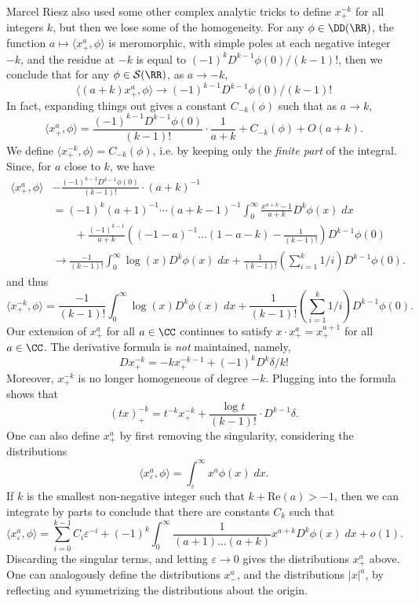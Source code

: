 \begin{example}
  Marcel Riesz also used some other complex analytic tricks to define $x^{-k}_+$ for all integers $k$, but then we lose some of the homogeneity. For any $\phi \in \DD(\RR)$, the function $a \mapsto \langle x^a_+, \phi \rangle$ is meromorphic, with simple poles at each negative integer $-k$, and the residue at $-k$ is equal to $(-1)^k D^{k-1} \phi(0) / (k-1)!$, then we conclude that for any $\phi \in \mathcal{S}(\RR)$, as $a \to -k$,
  \[ \langle (a + k) x^a_+, \phi \rangle \to (-1)^{k-1} D^{k-1} \phi(0) / (k-1)! \]
  In fact, expanding things out gives a constant $C_{-k}(\phi)$ such that as $a \to k$,
  \[ \langle x^a_+, \phi \rangle = \frac{(-1)^{k-1} D^{k-1} \phi(0)}{(k-1)!} \cdot \frac{1}{a + k} + C_{-k}(\phi) + O(a+k). \]
  We define $\langle x^{-k}_+, \phi \rangle = C_{-k}(\phi)$, i.e. by keeping only the \emph{finite part} of the integral. Since, for $a$ close to $k$, we have
  \begin{align*} \langle x^a_+, \phi \rangle &- \frac{(-1)^{k-1} D^{k-1} \phi(0)}{(k-1)!} \cdot (a+k)^{-1}\\
  &= (-1)^k (a+1)^{-1} \cdots (a+k-1)^{-1} \int_0^\infty \frac{x^{a + k} - 1}{a+k} D^k \phi(x)\; dx\\
  &\quad\quad + \frac{(-1)^{k-1}}{a+k} \left( (-1-a)^{-1} \dots (1-a-k) - \frac{1}{(k-1)!} \right) D^{k-1} \phi(0)\\
  &\to \frac{-1}{(k-1)!} \int_0^\infty \log(x) D^k \phi(x)\; dx + \frac{1}{(k-1)!} \left(\sum_{i = 1}^k 1/i \right) D^{k-1} \phi(0).
  \end{align*}
  and thus
  \[ \langle x^{-k}_+, \phi \rangle = \frac{-1}{(k-1)!} \int_0^\infty \log(x) D^k \phi(x)\; dx + \frac{1}{(k-1)!} \left(\sum_{i = 1}^k 1/i \right) D^{k-1} \phi(0). \]
  Our extension of $x^a_+$ for all $a \in \CC$ continues to satisfy $x \cdot x^a_+ = x^{a+1}_+$ for all $a \in \CC$. The derivative formula is \emph{not} maintained, namely,
  \[ D x^{-k}_+ = -k x^{-k-1}_+ + (-1)^k D^k \delta / k! \]
  Moreover, $x^{-k}_+$ is no longer homogeneous of degree $-k$. Plugging into the formula shows that
  \[ (tx)^{-k}_+ = t^{-k} x^{-k}_+ + \frac{\log t}{(k-1)!} \cdot D^{k-1} \delta. \]
  One can also define $x^a_+$ by first removing the singularity, considering the distributions
  \[ \langle x^a_\varepsilon, \phi \rangle = \int_\varepsilon^\infty x^a \phi(x)\; dx. \]
  If $k$ is the smallest non-negative integer such that $k + \text{Re}(a) > -1$, then we can integrate by parts to conclude that there are constants $C_k$ such that
  \[ \langle x^a_\varepsilon, \phi \rangle = \sum_{i = 0}^{k-1} C_i \varepsilon^{-i} + (-1)^k \int_0^\infty \frac{1}{(a+1) \dots (a+k)} x^{a + k} D^k \phi(x)\; dx + o(1). \]
  Discarding the singular terms, and letting $\varepsilon \to 0$ gives the distributions $x^a_+$ above. One can analogously define the distributions $x^a_-$, and the distributions $|x|^a$, by reflecting and symmetrizing the distributions about the origin.
\end{example}

